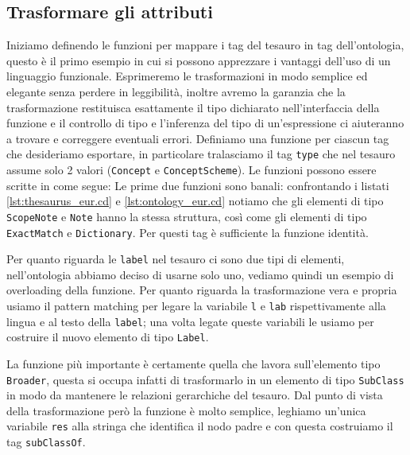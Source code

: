 \subsection{Trasformare gli attributi}
Iniziamo definendo le funzioni per mappare i tag del tesauro in tag dell'ontologia, questo è il primo esempio in cui si possono apprezzare i vantaggi dell'uso di un linguaggio funzionale. Esprimeremo le trasformazioni in modo semplice ed elegante senza perdere in leggibilità, inoltre avremo la garanzia che la trasformazione restituisca esattamente il tipo dichiarato nell'interfaccia della funzione e il controllo di tipo e l'inferenza del tipo di un'espressione ci aiuteranno a trovare e correggere eventuali errori. Definiamo una funzione per ciascun tag che desideriamo esportare, in particolare tralasciamo il tag \verb|type| che nel tesauro assume solo 2 valori (\verb|Concept| e \verb|ConceptScheme|). Le funzioni possono essere scritte in \cduce come segue:
Le prime due funzioni sono banali: confrontando i listati \ref{lst:thesaurus_eur.cd} e \ref{lst:ontology_eur.cd} notiamo che gli elementi di tipo \verb|ScopeNote| e \verb|Note| hanno la stessa struttura, così come gli elementi di tipo \verb|ExactMatch| e \verb|Dictionary|. Per questi tag è sufficiente la funzione identità.

Per quanto riguarda le \verb|label| nel tesauro ci sono due tipi di elementi, nell'ontologia abbiamo deciso di usarne solo uno, vediamo quindi un esempio di overloading della funzione. Per quanto riguarda la trasformazione vera e propria usiamo il pattern matching per legare la variabile \verb|l| e \verb|lab| rispettivamente alla lingua e al testo della \verb|label|; una volta legate queste variabili le usiamo per costruire il nuovo elemento di tipo \verb|Label|.

La funzione più importante è certamente quella che lavora sull'elemento tipo \verb|Broader|, questa si occupa infatti di trasformarlo in un elemento di tipo \verb|SubClass| in modo da mantenere le relazioni gerarchiche del tesauro. Dal punto di vista della trasformazione però la funzione è molto semplice, leghiamo un'unica variabile \verb|res| alla stringa che identifica il nodo padre e con questa costruiamo il tag \verb|subClassOf|.
